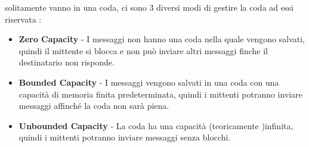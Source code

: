 \documentclass[12pt, letterpaper]{article}
\begin{document}
solitamente vanno in una coda, 
ci sono 3 diversi modi di gestire la coda ad essi riservata :
\begin{itemize}
    \item \textbf{Zero Capacity} - I messaggi non hanno una coda nella quale vengono salvati, quindi il mittente 
    si blocca e non può inviare altri messaggi finche il destinatario non risponde.
    \item \textbf{Bounded Capacity} - I messaggi vengono salvati in una coda con una
     capacità di memoria finita predeterminata, quindi i mittenti potranno inviare messaggi affinché la coda 
     non sarà piena.
     \item \textbf{Unbounded Capacity} - La coda ha una capacità (teoricamente )infinita, quindi i mittenti 
     potranno inviare messaggi senza blocchi.
\end{itemize} 
\begin{figure}[h]
\end{figure}
\end{document}
